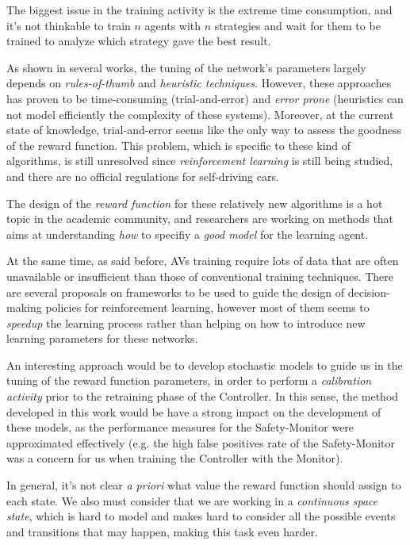 The biggest issue in the training activity is the extreme time consumption, and it's not thinkable to train $n$ agents with $n$ strategies and wait for them to be trained to analyze which strategy gave the best result.

As shown in several works, the tuning of the network's parameters largely depends on \textsl{rules-of-thumb} and \textsl{heuristic techniques}. However, these approaches has proven to be time-consuming (trial-and-error) and \textsl{error prone} (heuristics can not model efficiently the complexity of these systems).
Moreover, at the current state of knowledge, trial-and-error seems like the only way to assess the goodness of the reward function. This problem, which is specific to these kind of algorithms, is still unresolved since \textsl{reinforcement learning} is still being studied, and there are no official regulations for self-driving cars. \cite{rewardtrialanderror2}

The design of the \textsl{reward function} for these relatively new algorithms is a hot topic in the academic community, and researchers are working on methods that aims at understanding \textsl{how} to specifiy a \textsl{good model} for the learning agent. \cite{reward1} \cite{reward2} \cite{reward3}

At the same time, as said before, AVs training require lots of data that are often unavailable or insufficient than those of conventional training techniques. There are several proposals on frameworks to be used to guide the design of decision-making policies for reinforcement learning, however most of them seems to \textsl{speedup} the learning process rather than helping on how to introduce new learning parameters for these networks. \cite{rewardtrialanderror1}

An interesting approach would be to develop stochastic models to guide us in the tuning of the reward function parameters, in order to perform a \textsl{calibration activity} prior to the retraining phase of the Controller. In this sense, the method developed in this work would be have a strong impact on the development of these models, as the performance measures for the Safety-Monitor were approximated effectively (e.g. the high false positives rate of the Safety-Monitor was a concern for us when training the Controller with the Monitor).\newline

In general, it's not clear \textsl{a priori} what value the reward function should assign to each state. We also must consider that we are working in a \textsl{continuous space state}, which is hard to model and makes hard to consider all the possible events and transitions that may happen, making this task even harder.

